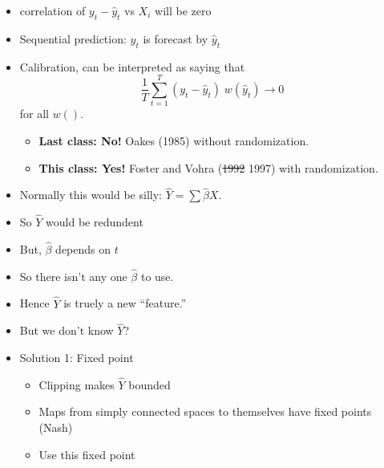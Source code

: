 \documentclass[landscape]{slides}
\begin{document}

\begin{itemize}
\item correlation of $y_t - \hat{y}_t$ vs $X_i$ will be zero
\end{itemize}


\begin{itemize}
\item Sequential prediction: $y_t$ is forecast by $\hat{y}_t$
\item Calibration, can be interpreted as saying that
\begin{displaymath}
\frac{1}{T} \sum_{t=1}^T (y_t - \hat{y}_t) \; w(\hat{y}_t) \to 0 
\end{displaymath}
for all $w()$.
\begin{itemize}
\item {\bf Last class: No!}  Oakes (1985)  without randomization.
\item {\bf This class: Yes!} Foster and Vohra ({\color{red}\sout{1992}} 1997) with randomization.
\end{itemize}
\end{itemize}



\begin{itemize}
\item Normally this would be silly: $\hat Y = \sum \hat \beta X$.
\item So $\hat Y$ would be redundent
\item But, $\hat\beta$ depends on $t$
\item So there isn't any one $\hat\beta$ to use.
\item Hence $\hat Y$ is truely a new ``feature.''
\end{itemize}


\begin{itemize}
\item But we don't know $\hat Y$?
\item Solution 1: Fixed point
\begin{itemize}
\item Clipping makes $\hat Y$ bounded
\item Maps from simply connected spaces to themselves have fixed
points (Nash)
\item Use this fixed point
\end{itemize}
\end{itemize}
\end{document}
